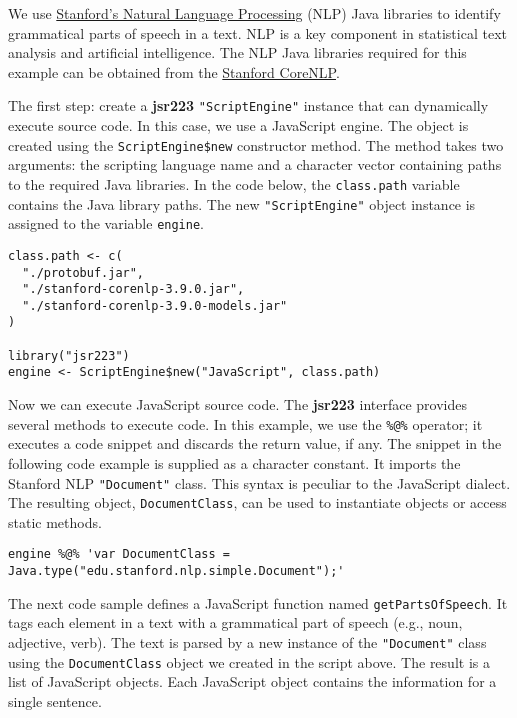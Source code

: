 \documentclass[
article,
11pt, %
a4paper, %
oneside, %
headinclude,footinclude, %
]{scrartcl}
\theoremstyle{definition} %
\theoremstyle{plain} %
\theoremstyle{remark} %
\newcommand{\pkg}[1]{\textbf{#1}}
\newcommand{\code}[1]{\texttt{#1}}
\begin{document}

We use \href{https://nlp.stanford.edu/}{Stanford's Natural Language Processing} (NLP) Java libraries to identify grammatical parts of speech in a text. NLP is a key component in statistical text analysis and artificial intelligence. The NLP Java libraries required for this example can be obtained from the \href{https://stanfordnlp.github.io/CoreNLP/index.html}{Stanford CoreNLP}.

The first step: create a \pkg{jsr223} \code{"ScriptEngine"} instance that can dynamically execute source code. In this case, we use a JavaScript engine. The object is created using the \code{ScriptEngine\$new} constructor method. The method takes two arguments: the scripting language name and a character vector containing paths to the required Java libraries. In the code below, the \code{class.path} variable contains the Java library paths. The new \code{"ScriptEngine"} object instance is assigned to the variable \code{engine}.

\begin{verbatim}
class.path <- c(
  "./protobuf.jar",
  "./stanford-corenlp-3.9.0.jar",
  "./stanford-corenlp-3.9.0-models.jar"
)

library("jsr223")
engine <- ScriptEngine$new("JavaScript", class.path)
\end{verbatim}
Now we can execute JavaScript source code. The \pkg{jsr223} interface provides several methods to execute code. In this example, we use the \code{\%@\%} operator; it  executes a code snippet and discards the return value, if any. The snippet in the following code example is supplied as a character constant. It imports the Stanford NLP \code{"Document"} class. This syntax is peculiar to the JavaScript dialect. The resulting object, \code{DocumentClass}, can be used to instantiate objects or access static methods.

\begin{verbatim}
engine %@% 'var DocumentClass = Java.type("edu.stanford.nlp.simple.Document");'
\end{verbatim}
The next code sample defines a JavaScript function named \code{getPartsOfSpeech}. It tags each element in a text with a grammatical part of speech (e.g., noun, adjective, verb). The text is parsed by a new instance of the \code{"Document"} class using the \code{DocumentClass} object we created in the script above. The result is a list of JavaScript objects. Each JavaScript object contains the information for a single sentence.
\end{document}
